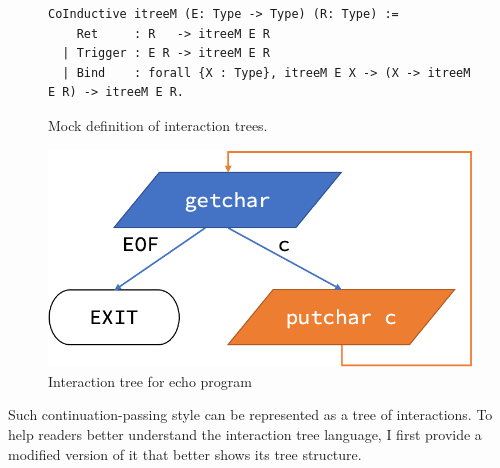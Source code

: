 \begin{figure}
\begin{lstlisting}[style=customcoq]
  CoInductive itreeM (E: Type -> Type) (R: Type) :=
    Ret     : R   -> itreeM E R
  | Trigger : E R -> itreeM E R
  | Bind    : forall {X : Type}, itreeM E X -> (X -> itreeM E R) -> itreeM E R.
\end{lstlisting}
\caption{Mock definition of interaction trees.}
\label{fig:mock-itree}
\end{figure}

\begin{figure}
  \includegraphics[width=.5\linewidth]{figures/echo-itree}
  \caption{Interaction tree for echo program}
  \label{fig:echo-itree}
\end{figure}

Such continuation-passing style can be represented as a tree of interactions.
To help readers better understand the interaction tree language, I first provide
a modified version of it that better shows its tree structure.

